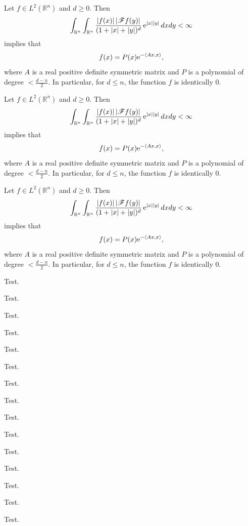 \documentclass{amse}
\numberwithin{equation}{section}
\begin{document}
\begin{exmp}
Let $f\in L^{2}(\mathbb R^{n})$ and $d \geq
0$. Then
\begin{equation}
\int_{\mathbb R^{n}} \int_{\mathbb R^{n}} \frac{|f(x)|\,
|\mathscr{F}{f}(y)|}{(1+|x|+|y|)^{d}}\, {\rm e}^{|x||y|}\,dxdy <
\infty
\end{equation}
implies that
$$
f(x)=P(x){\rm e}^{-\langle Ax,x\rangle},
$$
where $A$ is a real positive definite symmetric matrix and $P$ is
a polynomial of degree $<\frac{d-n}{2}$. In particular, for $d\leq
n$, the function $f$ is identically $0.$
\end{exmp}


\begin{rem}
Let $f\in L^{2}(\mathbb R^{n})$ and $d \geq
0$. Then
\begin{equation}
\int_{\mathbb R^{n}} \int_{\mathbb R^{n}} \frac{|f(x)|\,
|\mathscr{F}{f}(y)|}{(1+|x|+|y|)^{d}}\, {\rm e}^{|x||y|}\,dxdy <
\infty
\end{equation}
implies that
$$
f(x)=P(x){\rm e}^{-\langle Ax,x\rangle},
$$
where $A$ is a real positive definite symmetric matrix and $P$ is
a polynomial of degree $<\frac{d-n}{2}$. In particular, for $d\leq
n$, the function $f$ is identically $0.$
\end{rem}


\begin{case}
Let $f\in L^{2}(\mathbb R^{n})$ and $d \geq
0$. Then
\begin{equation}
\int_{\mathbb R^{n}} \int_{\mathbb R^{n}} \frac{|f(x)|\,
|\mathscr{F}{f}(y)|}{(1+|x|+|y|)^{d}}\, {\rm e}^{|x||y|}\,dxdy <
\infty
\end{equation}
implies that
$$
f(x)=P(x){\rm e}^{-\langle Ax,x\rangle},
$$
where $A$ is a real positive definite symmetric matrix and $P$ is
a polynomial of degree $<\frac{d-n}{2}$. In particular, for $d\leq
n$, the function $f$ is identically $0.$
\end{case}







\BeginRef

 Test.

 Test.

 Test.

 Test.

 Test.

 Test.

 Test.

 Test.

 Test.

 Test.

 Test.

 Test.

 Test.

 Test.

 Test.

\EndRef
\end{document}
